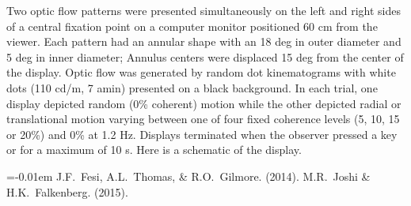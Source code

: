 \documentclass[landscape,final,a0paper,fontscale=0.285]{baposter}
\begin{document}
\begin{poster}

    {
      Two optic flow patterns were presented simultaneously on the left and right sides of a central fixation point on a computer monitor positioned 60 cm from the viewer.
      Each pattern had an annular shape with an 18 deg in outer diameter and 5 deg in inner diameter; Annulus centers were displaced 15 deg from the center of the display.
      Optic flow was generated by random dot kinematograms with white dots (110 cd/m, 7 amin) presented on a black background.
      In each trial, one display depicted random (0\% coherent) motion while the other depicted radial or translational motion varying between one of four fixed coherence levels (5, 10, 15 or 20\%) and 0\% at 1.2 Hz.
      Displays terminated when the observer pressed a key or for a maximum of 10 s.
      Here is a schematic of the display.

      \vspace{3em}
      \vspace{4em}
    }


    {
      \smaller
      
      \renewcommand{\section}[2]{\vskip 0.05em}
        \begin{thebibliography}{1}\itemsep=-0.01em
        \setlength{\baselineskip}{0.4em}
          J.F.~Fesi, A.L.~Thomas, \& R.O.~Gilmore. (2014).
          M.R.~Joshi \& H.K.~Falkenberg. (2015).
        \end{thebibliography}
     \vspace{0.3em}
    }


\end{poster}
\end{document}
